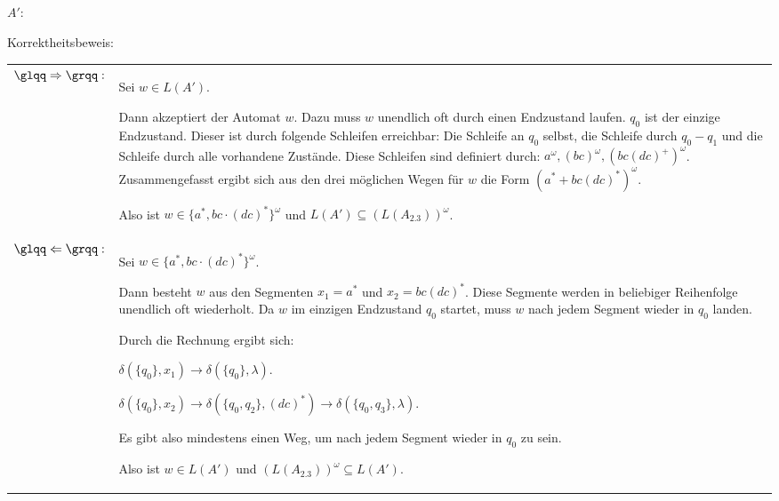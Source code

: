 \documentclass[12pt,a4paper]{../krautsourcing/homework}
\begin{document}
\subsection{}
\(A':\) \\

\newpage

\noindent Korrektheitsbeweis:\\
\begin{tabularx}{\linewidth}{@{}>{\bfseries}l@{\hspace{.5em}}X@{}}
    \(\glqq\Rightarrow\grqq:\) &
    Sei \(w \in L(A') \).

    Dann akzeptiert der Automat \(w\). Dazu muss \(w\) unendlich oft durch einen Endzustand laufen. \(q_0\) ist der einzige Endzustand. Dieser ist durch folgende Schleifen erreichbar: Die Schleife an \(q_0\) selbst, die Schleife durch \(q_0-q_1\) und die Schleife durch alle vorhandene Zustände. Diese Schleifen sind definiert durch: \(a^\omega, (bc)^\omega, (bc(dc)^+)^\omega \). Zusammengefasst ergibt sich aus den drei möglichen Wegen für \(w\) die Form \((a^* + bc(dc)^*)^\omega \).
	
    Also ist \(w \in \{a^*,b c \cdot (d c)^*\}^\omega \) und \(L(A') \subseteq(L(A_{2.3}))^\omega \).

     \\

    \(\glqq\Leftarrow\grqq:\) &
    Sei \(w \in \{a^*,b c \cdot (d c)^*\}^\omega \).

    Dann besteht \(w\) aus den Segmenten \(x_1 = a^*\) und \(x_2 = bc(dc)^*\). Diese Segmente werden in beliebiger Reihenfolge unendlich oft wiederholt. Da \(w\) im einzigen Endzustand \(q_0\) startet, muss \(w\) nach jedem Segment wieder in \(q_0\) landen.
	
    Durch die Rechnung ergibt sich:
	
    \(\delta(\{q_0\}, x_1) \rightarrow \delta(\{q_0\}, \lambda)\).
	
    \(\delta(\{q_0\}, x_2) \rightarrow \delta(\{q_0, q_2\}, (dc)^*) \rightarrow \delta(\{q_0, q_3\}, \lambda) \).
	
    Es gibt also mindestens einen Weg, um nach jedem Segment wieder in \(q_0\) zu sein.
	
    Also ist \(w \in L(A')\) und \((L(A_{2.3}))^\omega \subseteq L(A')\).	  
\end{tabularx}
\end{document}
